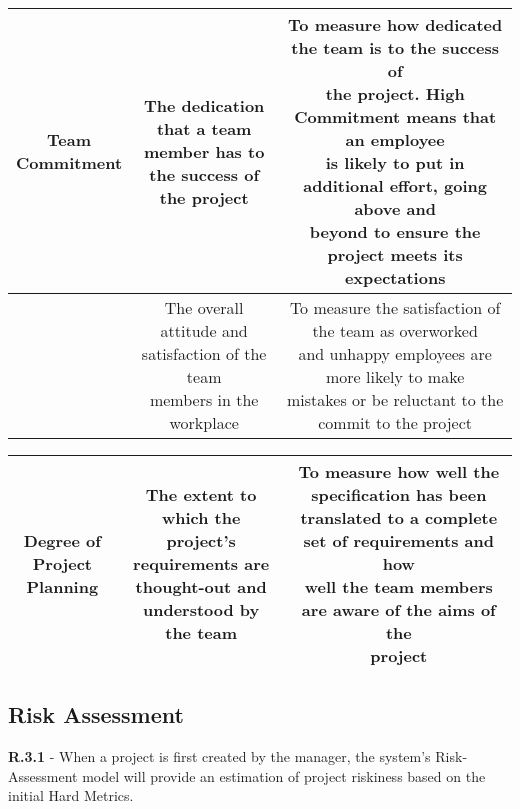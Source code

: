 \documentclass[a4paper]{article}
\theoremstyle{plain}
\theoremstyle{definition}
\theoremstyle{remark}
\begin{document}
\begin{table}[H]
\begin{tabular}{|c|c|c|}
		\hline
		\makecell{Team \\ Commitment} & \makecell{The dedication that a team \\ member has to the success of \\ the project} & \makecell{To measure how dedicated the team is to the success of \\ the project. High Commitment means that an employee \\ is likely to put in additional effort, going above and \\ beyond to ensure the project meets its expectations} \\
		\hline
		\makecell{Team Morale} & \makecell{The overall attitude and \\ satisfaction of the team \\ members in the workplace} & \makecell{To measure the satisfaction of the team as overworked \\ and unhappy employees are more likely to make \\ mistakes or be reluctant to the commit to the project} \\
		\hline
	\end{tabular}
\end{table}
\begin{table}[H]
	\centering
	\begin{tabular}{|c|c|c|}
		\hline
		\makecell{Degree of \\ Project Planning} & \makecell{The extent to which the \\ project's requirements are \\ thought-out and understood by \\ the team} & \makecell{To measure how well the specification has been \\ translated to a complete set of requirements and how \\ well the team members are aware of the aims of the \\ project} \\
		\hline
		
	\end{tabular}
\end{table}
\subsection*{Risk Assessment}
\textbf{R.3.1} - When a project is first created by the manager, the system’s Risk-Assessment model will provide an estimation of project riskiness based on the initial Hard Metrics. \\
\end{document}

